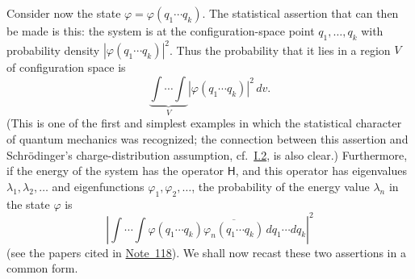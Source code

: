 \documentclass[fontsize=13pt,twoside,openany,headings=normal,parskip=false,bookmarkpackage=false,DIV=calc]{scrbook}
\begin{document}
Consider now the state $\varphi=\varphi(q_1\cdots q_k)$. The statistical assertion that can then be made is this: the system is at the configuration-space point $q_1,\ldots,q_k$ with probability density $|\varphi(q_1\cdots q_k)|^2$. Thus the probability that it lies in a region $V$ of configuration space is
\[
\underbrace{\int\cdots\int}_{V}|\varphi(q_1\cdots q_k)|^2\,dv.
\]
(This is one of the first and simplest examples in which the statistical character of quantum mechanics was recognized;
\hypertarget{origpage-103}{}%
the connection between this assertion and Schrödinger's charge-distribution assumption, cf.\ \hyperref[sec:I.2]{I.2}, is also clear.) Furthermore, if the energy of the system has the operator $\mathsf H$, and this operator has eigenvalues $\lambda_1,\lambda_2,\ldots$ and eigenfunctions $\varphi_1,\varphi_2,\ldots$, the probability of the energy value $\lambda_n$ in the state $\varphi$ is
\[
\left|\int\cdots\int\varphi(q_1\cdots q_k)
\overline{\varphi_n(q_1\cdots q_k)}\,dq_1\cdots dq_k\right|^2
\]
(see the papers cited in \hyperlink{note-118}{Note~118}). We shall now recast these two assertions in a common form.
\end{document}

